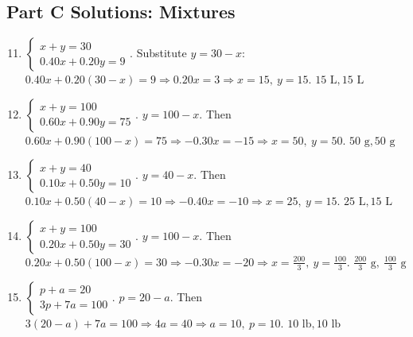 \documentclass[14pt]{extarticle}
\begin{document}
\subsection*{Part C Solutions: Mixtures}
\begin{enumerate}
  \setcounter{enumi}{10}
  \item \(\begin{cases} x+y=30 \\ 0.40x+0.20y=9 \end{cases}\).  
  Substitute \(y=30-x\): \(0.40x+0.20(30-x)=9 \Rightarrow 0.20x=3 \Rightarrow x=15,\ y=15\). \(\boxed{15\text{ L},15\text{ L}}\)

  \item \(\begin{cases} x+y=100 \\ 0.60x+0.90y=75 \end{cases}\).  
  \(y=100-x\). Then \(0.60x+0.90(100-x)=75 \Rightarrow -0.30x=-15 \Rightarrow x=50,\ y=50\). \(\boxed{50\text{ g},50\text{ g}}\)

  \item \(\begin{cases} x+y=40 \\ 0.10x+0.50y=10 \end{cases}\).  
  \(y=40-x\). Then \(0.10x+0.50(40-x)=10 \Rightarrow -0.40x=-10 \Rightarrow x=25,\ y=15\). \(\boxed{25\text{ L},15\text{ L}}\)

  \item \(\begin{cases} x+y=100 \\ 0.20x+0.50y=30 \end{cases}\).  
  \(y=100-x\). Then \(0.20x+0.50(100-x)=30 \Rightarrow -0.30x=-20 \Rightarrow x=\frac{200}{3},\ y=\frac{100}{3}\).  
  \(\boxed{\tfrac{200}{3}\text{ g},\ \tfrac{100}{3}\text{ g}}\)

  \item \(\begin{cases} p+a=20 \\ 3p+7a=100 \end{cases}\).  
  \(p=20-a\). Then \(3(20-a)+7a=100 \Rightarrow 4a=40 \Rightarrow a=10,\ p=10\). \(\boxed{10\text{ lb},10\text{ lb}}\)
\end{enumerate}
\end{document}
